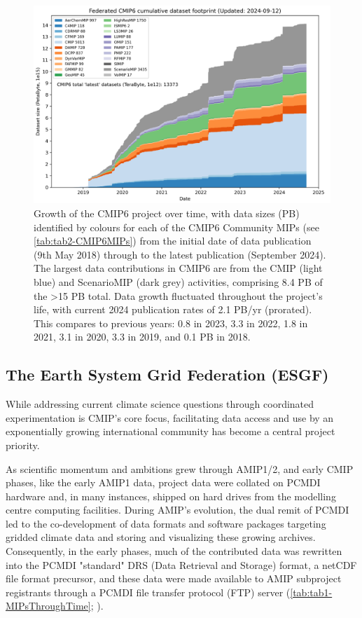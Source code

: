 \documentclass[gmd, preprint]{copernicus}
\begin{document}
\begin{figure}
    \centering
    \includegraphics[width=1\linewidth]{240912T141943_ESGF-PublicationStatsPB.png}
    \caption{Growth of the CMIP6 project over time, with data sizes (PB) identified by colours for each of the CMIP6 Community MIPs (see \autoref{tab:tab2-CMIP6MIPs}) from the initial date of data publication (9th May 2018) through to the latest publication (September 2024). The largest data contributions in CMIP6 are from the CMIP (light blue) and ScenarioMIP (dark grey) activities, comprising 8.4 PB of the >15 PB total. Data growth fluctuated throughout the project's life, with current 2024 publication rates of 2.1 PB/yr (prorated). This compares to previous years: 0.8 in 2023, 3.3 in 2022, 1.8 in 2021, 3.1 in 2020, 3.3 in 2019, and 0.1 PB in 2018.}
    \label{fig:fig2-CMIP6DataGrowth}
\end{figure}


\subsection{The Earth System Grid Federation (ESGF)}
\label{sec:earthSystemGridFederation}

While addressing current climate science questions through coordinated experimentation is CMIP's core focus, facilitating data access and use by an exponentially growing international community has become a central project priority. 

As scientific momentum and ambitions grew through AMIP1/2, and early CMIP phases, like the early AMIP1 data, project data were collated on PCMDI hardware and, in many instances, shipped on hard drives from the modelling centre computing facilities. During AMIP's evolution, the dual remit of PCMDI led to the co-development of data formats and software packages targeting gridded climate data and storing and visualizing these growing archives. Consequently, in the early phases, much of the contributed data was rewritten into the PCMDI "standard" DRS (Data Retrieval and Storage) format, a netCDF file format precursor, and these data were made available to AMIP subproject registrants through a PCMDI file transfer protocol (FTP) server (\autoref{tab:tab1-MIPsThroughTime}; \citet{gates_amip_1995}).
\end{document}
